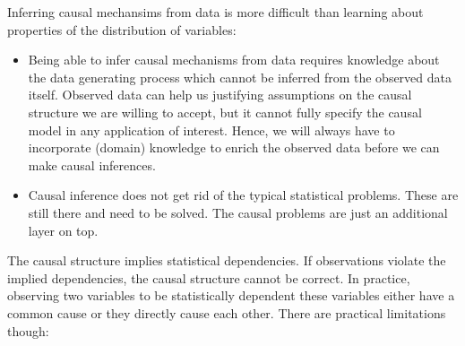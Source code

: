 \documentclass[
]{book}
\providecommand{\tightlist}{%
  \setlength{\itemsep}{0pt}\setlength{\parskip}{0pt}}
\theoremstyle{definition}
\theoremstyle{definition}
\theoremstyle{definition}
\theoremstyle{remark}
\begin{document}
Inferring causal mechansims from data is more difficult than learning about properties of the distribution of variables:

\begin{itemize}
\tightlist
\item
  Being able to infer causal mechanisms from data requires knowledge about the data generating process which cannot be inferred from the observed data itself. Observed data can help us justifying assumptions on the causal structure we are willing to accept, but it cannot fully specify the causal model in any application of interest. Hence, we will always have to incorporate (domain) knowledge to enrich the observed data before we can make causal inferences.
\item
  Causal inference does not get rid of the typical statistical problems. These are still there and need to be solved. The causal problems are just an additional layer on top.
\end{itemize}

The causal structure implies statistical dependencies. If observations violate the implied dependencies, the causal structure cannot be correct. In practice, observing two variables to be statistically dependent these variables either have a common cause or they directly cause each other. There are practical limitations though:
\end{document}
